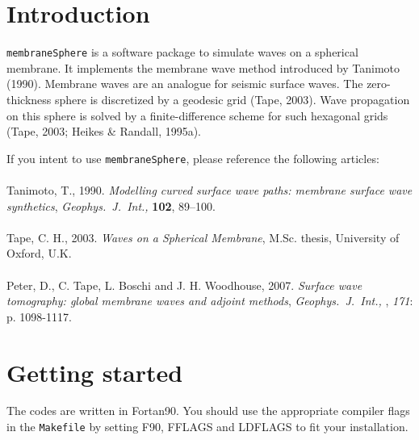 \documentclass[a4paper,
                          headsepline,
                          listof=totoc,
                          toc=listof,
                          headings=small]{scrreprt} %
\newcommand{\gji}{\textit{Geophys.\ J.\ Int.,} }
\begin{document}

\renewcommand{\contentsname}{Table of Contents}
\tableofcontents

\chapter{Introduction}
\texttt{membraneSphere} is a software package to simulate waves on a spherical
membrane. It implements the membrane wave method introduced by {Tanimoto (1990)}.
Membrane waves are an analogue for seismic surface waves. The zero-thickness
sphere is discretized by a geodesic grid ({Tape}, 2003). Wave propagation on
this sphere is solved by a finite-difference scheme for such
hexagonal grids (Tape, 2003; {Heikes \& Randall}, 1995a).

If you intent to use \texttt{membraneSphere}, please reference the
following articles:
\\
\\
Tanimoto, T., 1990.
\textit{Modelling curved surface wave paths: membrane surface wave synthetics},
\gji \textbf{102}, 89--100.
\\
\\
Tape, C. H., 2003.
\textit{Waves on a Spherical Membrane},
M.Sc. thesis, University of Oxford, U.K.
\\
\\
Peter, D., C. Tape, L. Boschi and J. H. Woodhouse, 2007.
\textit{Surface wave tomography: global membrane waves and adjoint methods},
\textit{\gji}, \textit{171}: p. 1098-1117.\\


\chapter{Getting started}
The codes are written in Fortan90. You should use the appropriate compiler flags
in the \texttt{Makefile} by setting \textsf{F90}, \textsf{FFLAGS} and \textsf{LDFLAGS}
to fit your installation.
\end{document}
